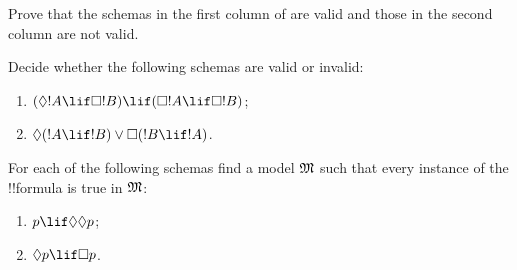\documentclass[../../../include/open-logic-section]{subfiles}
\begin{document}
\begin{prob}%
  Prove that the schemas in the first column of
   are valid and those in
  the second column are not valid.
\end{prob}

\begin{prob}
  Decide whether the following schemas are valid or invalid:
  \begin{enumerate}
  \item $(\Diamond !A \lif \Box !B) \lif (\Box !A \lif \Box
    !B)$;
  \item $\Diamond(!A \lif !B) \lor \Box(!B \lif !A)$.
  \end{enumerate}
\end{prob}

\begin{prob}
  For each of the following schemas find a model $\mModel{M}$ such
  that every instance of the !!{formula} is true in $\mModel{M}$:
  \begin{enumerate}
  \item $p \lif \Diamond\Diamond p$;
  \item $\Diamond p \lif \Box p$.
  \end{enumerate}
\end{prob}
\end{document}
